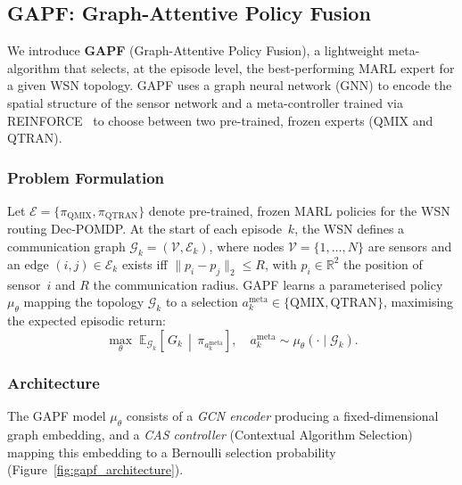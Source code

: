 \documentclass[12pt, onecolumn, journal]{IEEEtran}
\begin{document}
\subsection{GAPF: Graph-Attentive Policy Fusion}
\label{sec:gapf}

We introduce \textbf{GAPF} (Graph-Attentive Policy Fusion), a lightweight meta-algorithm that selects, at the episode level, the best-performing MARL expert for a given WSN topology. GAPF uses a graph neural network (GNN) to encode the spatial structure of the sensor network and a meta-controller trained via REINFORCE~\cite{williams1992simple} to choose between two pre-trained, frozen experts (QMIX and QTRAN).

\subsubsection{Problem Formulation}
\label{sec:gapf_formulation}

Let $\mathcal{E} = \{\pi_{\text{QMIX}}, \pi_{\text{QTRAN}}\}$ denote pre-trained, frozen MARL policies for the WSN routing Dec-POMDP. At the start of each episode~$k$, the WSN defines a communication graph $\mathcal{G}_k = (\mathcal{V}, \mathcal{E}_k)$, where nodes $\mathcal{V} = \{1, \dots, N\}$ are sensors and an edge $(i,j) \in \mathcal{E}_k$ exists iff $\|p_i - p_j\|_2 \leq R$, with $p_i \in \mathbb{R}^2$ the position of sensor~$i$ and $R$ the communication radius. GAPF learns a parameterised policy $\mu_\theta$ mapping the topology $\mathcal{G}_k$ to a selection $a^{\text{meta}}_k \in \{\text{QMIX}, \text{QTRAN}\}$, maximising the expected episodic return:
\begin{equation}
    \max_\theta \; \mathbb{E}_{\mathcal{G}_k}\!\left[\, G_k \,\middle|\, \pi_{a^{\text{meta}}_k}\right], \quad a^{\text{meta}}_k \sim \mu_\theta(\cdot \mid \mathcal{G}_k).
    \label{eq:gapf_objective}
\end{equation}

\subsubsection{Architecture}
\label{sec:gapf_architecture}

The GAPF model $\mu_\theta$ consists of a \emph{GCN encoder} producing a fixed-dimensional graph embedding, and a \emph{CAS controller} (Contextual Algorithm Selection) mapping this embedding to a Bernoulli selection probability (Figure~\ref{fig:gapf_architecture}).
\end{document}
